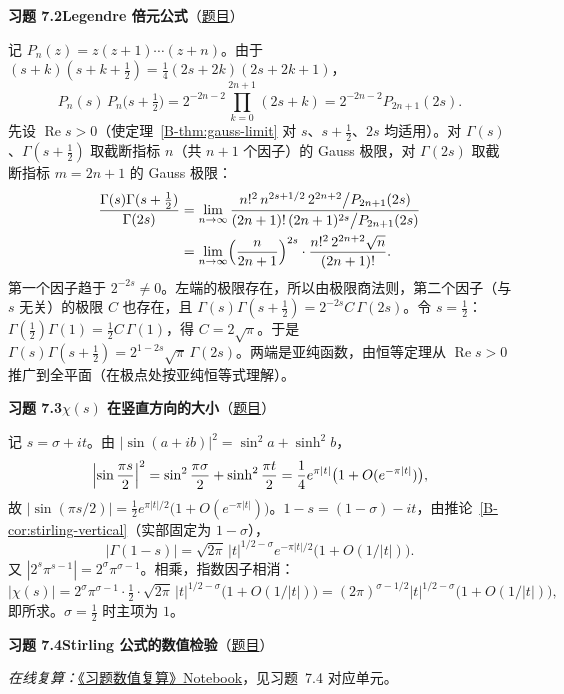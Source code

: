 \documentclass[11pt,a4paper]{article}
\renewcommand{\Re}{\operatorname{Re}}
\newcommand{\bref}[1]{\ref*{B-#1}}
\newcommand{\Sol}[2]{%
  \par\addvspace{1.2em}\noindent
  \hypertarget{s:#1}{}\textbf{习题 #1\quad #2}\hfill{\small（\hyperlink{q:#1}{题目}）}\par
  \nopagebreak\smallskip}
\begin{document}
\Sol{7.2}{Legendre 倍元公式}
记 $P_n(z)=z(z+1)\cdots(z+n)$。由于 $(s+k)(s+k+\tfrac12)=\tfrac14(2s+2k)(2s+2k+1)$，
\[
  P_n(s)\,P_n\bigl(s+\tfrac12\bigr)=2^{-2n-2}\prod_{k=0}^{2n+1}(2s+k)=2^{-2n-2}P_{2n+1}(2s).
\]
先设 $\Re s>0$（使定理~\bref{thm:gauss-limit} 对 $s$、$s+\tfrac12$、$2s$ 均适用）。对 $\Gamma(s)$、$\Gamma(s+\tfrac12)$ 取截断指标 $n$（共 $n+1$ 个因子）的 Gauss 极限，对 $\Gamma(2s)$ 取截断指标 $m=2n+1$ 的 Gauss 极限：
\[
\begin{aligned}
  \frac{\Gamma(s)\Gamma(s+\frac12)}{\Gamma(2s)}
  &=\lim_{n\to\infty}\frac{n!^2\,n^{2s+1/2}\,2^{2n+2}\big/P_{2n+1}(2s)}{(2n+1)!\,(2n+1)^{2s}\big/P_{2n+1}(2s)}\\
  &=\lim_{n\to\infty}\Bigl(\frac{n}{2n+1}\Bigr)^{2s}\cdot\frac{n!^2\,2^{2n+2}\sqrt n}{(2n+1)!}.
\end{aligned}
\]
第一个因子趋于 $2^{-2s}\ne0$。左端的极限存在，所以由极限商法则，第二个因子（与 $s$ 无关）的极限 $C$ 也存在，且
$\Gamma(s)\Gamma(s+\tfrac12)=2^{-2s}C\,\Gamma(2s)$。令 $s=\tfrac12$：$\Gamma(\tfrac12)\Gamma(1)=\tfrac12C\,\Gamma(1)$，得 $C=2\sqrt\pi$。于是
$\Gamma(s)\Gamma(s+\tfrac12)=2^{1-2s}\sqrt\pi\,\Gamma(2s)$。两端是亚纯函数，由恒等定理从 $\Re s>0$ 推广到全平面（在极点处按亚纯恒等式理解）。

\Sol{7.3}{$\chi(s)$ 在竖直方向的大小}
记 $s=\sigma+it$。由 $|\sin(a+ib)|^2=\sin^2a+\sinh^2b$，
\[
  \Bigl|\sin\frac{\pi s}2\Bigr|^2=\sin^2\frac{\pi\sigma}2+\sinh^2\frac{\pi t}2=\frac14e^{\pi|t|}\bigl(1+O(e^{-\pi|t|})\bigr),
\]
故 $|\sin(\pi s/2)|=\tfrac12e^{\pi|t|/2}\bigl(1+O(e^{-\pi|t|})\bigr)$。$1-s=(1-\sigma)-it$，由推论~\bref{cor:stirling-vertical}（实部固定为 $1-\sigma$），
\[
  |\Gamma(1-s)|=\sqrt{2\pi}\,|t|^{1/2-\sigma}e^{-\pi|t|/2}\bigl(1+O(1/|t|)\bigr).
\]
又 $|2^s\pi^{s-1}|=2^\sigma\pi^{\sigma-1}$。相乘，指数因子相消：
\[
  |\chi(s)|=2^\sigma\pi^{\sigma-1}\cdot\tfrac12\cdot\sqrt{2\pi}\,|t|^{1/2-\sigma}\bigl(1+O(1/|t|)\bigr)
  =(2\pi)^{\sigma-1/2}|t|^{1/2-\sigma}\bigl(1+O(1/|t|)\bigr),
\]
即所求。$\sigma=\tfrac12$ 时主项为 $1$。

\Sol{7.4}{Stirling 公式的数值检验}
\emph{在线复算：}\href{https://colab.research.google.com/github/lichengtong123/lichengtong-RH/blob/main/\%E4\%B9\%A0\%E9\%A2\%98\%E4\%B8\%8E\%E8\%A7\%A3\%E7\%AD\%94/\%E4\%B9\%A0\%E9\%A2\%98\%E6\%95\%B0\%E5\%80\%BC\%E5\%A4\%8D\%E7\%AE\%97.ipynb}{《习题数值复算》Notebook}，见习题~7.4 对应单元。
\end{document}
